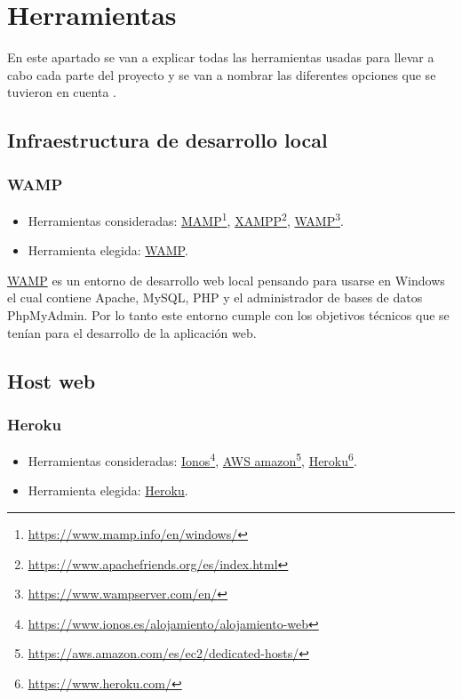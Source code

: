\section{Herramientas} 

En este apartado se van a explicar todas las herramientas usadas para llevar a cabo cada parte del proyecto y se van a nombrar las diferentes opciones que se tuvieron en cuenta .

\subsection{Infraestructura de desarrollo local}

\subsubsection{WAMP} \label{WAMP}
\begin{itemize}
    \item Herramientas consideradas: \href{https://www.mamp.info/en/windows/}{MAMP}\footnote{\href{https://www.mamp.info/en/windows/}{https://www.mamp.info/en/windows/}}, \href{https://www.apachefriends.org/es/index.html}{XAMPP}\footnote{\href{https://www.apachefriends.org/es/index.html}{https://www.apachefriends.org/es/index.html}}, \href{https://www.wampserver.com/en/}{WAMP}\footnote{\label{wampfoot}\href{https://www.wampserver.com/en/}{https://www.wampserver.com/en/}}.
	\item Herramienta elegida: \href{https://www.wampserver.com/en/}{WAMP}.
\end{itemize}

\href{http://www.wampserver.es/}{WAMP} es un entorno de desarrollo web local pensando para usarse en Windows el cual contiene Apache, MySQL, PHP y el administrador de bases de datos PhpMyAdmin. Por lo tanto este entorno cumple con los objetivos técnicos que se tenían para el desarrollo de la aplicación web.

\subsection{Host web}

\subsubsection{Heroku} \label{Heroku}
\begin{itemize}
    \item Herramientas consideradas: \href{https://www.ionos.es/alojamiento/alojamiento-web}{Ionos}\footnote{\href{https://www.ionos.es/alojamiento/alojamiento-web}{https://www.ionos.es/alojamiento/alojamiento-web}}, \href{https://aws.amazon.com/es/ec2/dedicated-hosts/}{AWS amazon}\footnote{\href{https://aws.amazon.com/es/ec2/dedicated-hosts/}{https://aws.amazon.com/es/ec2/dedicated-hosts/}}, \href{https://www.heroku.com/}{Heroku}\footnote{\label{herokufoot}\href{https://www.heroku.com/}{https://www.heroku.com/}}.
    \item Herramienta elegida: \href{https://www.heroku.com/}{Heroku}.
\end{itemize}

